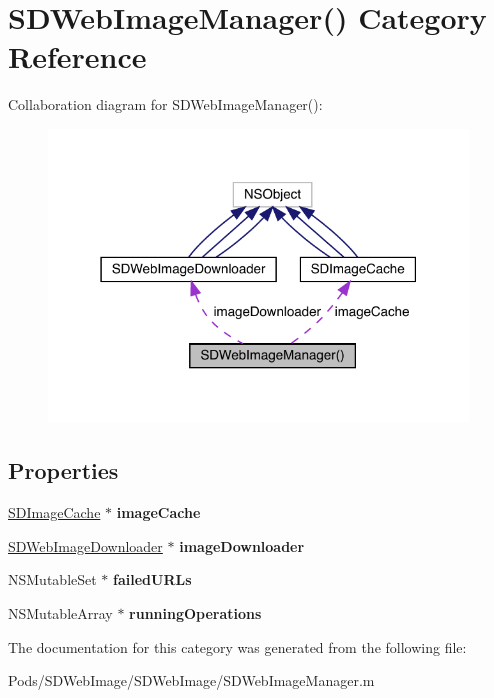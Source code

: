 \hypertarget{category_s_d_web_image_manager_07_08}{}\section{S\+D\+Web\+Image\+Manager() Category Reference}
\label{category_s_d_web_image_manager_07_08}


Collaboration diagram for S\+D\+Web\+Image\+Manager()\+:\nopagebreak
\begin{figure}[H]
\begin{center}
\leavevmode
\includegraphics[width=316pt]{category_s_d_web_image_manager_07_08__coll__graph}
\end{center}
\end{figure}
\subsection*{Properties}
\begin{DoxyCompactItemize}
\item 
\mbox{\label{category_s_d_web_image_manager_07_08_a00dd37e2aa39558f2a5c16b2b655c729}} 
\mbox{\hyperlink{interface_s_d_image_cache}{S\+D\+Image\+Cache}} $\ast$ {\bfseries image\+Cache}
\item 
\mbox{\label{category_s_d_web_image_manager_07_08_a7e66111dcc164b2423b991ca52a3a503}} 
\mbox{\hyperlink{interface_s_d_web_image_downloader}{S\+D\+Web\+Image\+Downloader}} $\ast$ {\bfseries image\+Downloader}
\item 
\mbox{\label{category_s_d_web_image_manager_07_08_a01f02dad32e74342ebde6f9213015c92}} 
N\+S\+Mutable\+Set $\ast$ {\bfseries failed\+U\+R\+Ls}
\item 
\mbox{\label{category_s_d_web_image_manager_07_08_a7e08e6a2e0f0f1a0ec8ecff9bcd66f3a}} 
N\+S\+Mutable\+Array $\ast$ {\bfseries running\+Operations}
\end{DoxyCompactItemize}


The documentation for this category was generated from the following file\+:\begin{DoxyCompactItemize}
\item 
Pods/\+S\+D\+Web\+Image/\+S\+D\+Web\+Image/S\+D\+Web\+Image\+Manager.\+m\end{DoxyCompactItemize}
